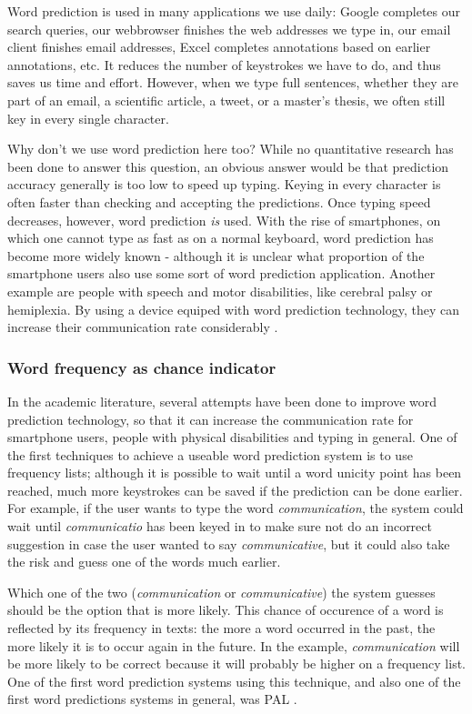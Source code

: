 \documentclass[12pt]{article}
\begin{document}
Word prediction is used in many applications we use daily: Google completes our search queries, our webbrowser finishes the web addresses we type in, our email client finishes email addresses, Excel completes annotations based on earlier annotations, etc. It reduces the number of keystrokes we have to do, and thus saves us time and effort. However, when we type full sentences, whether they are part of an email, a scientific article, a tweet, or a master's thesis, we often still key in every single character. 

Why don't we use word prediction here too? While no quantitative research has been done to answer this question, an obvious answer would be that prediction accuracy generally is too low to speed up typing. Keying in every character is often faster than checking and accepting the predictions. Once typing speed decreases, however, word prediction \emph{is} used. With the rise of smartphones,  on which one  cannot type as fast as on a normal keyboard, word prediction has become more widely known - although it is unclear what proportion of the smartphone users also use some sort of word prediction application. Another example are  people with speech and motor disabilities, like cerebral palsy or hemiplexia. By using a device equiped with word prediction technology, they can increase their communication rate considerably \cite{Garay-Vitoria+06}.

\subsubsection{Word frequency as chance indicator}

In the academic literature, several attempts have been done to improve word prediction technology, so that it can increase the communication rate for smartphone users, people with physical disabilities and typing in general. One of the first techniques to achieve a useable word prediction system is to use frequency lists; although it is possible to wait until a word unicity point has been reached, much more keystrokes can be saved if the prediction can be done earlier. For example, if the user wants to type the word \emph{communication}, the system could wait until \emph{communicatio} has been keyed in to make sure not do an incorrect suggestion in case the user wanted to say \emph{communicative}, but it could also take the risk and guess one of the words much earlier. 

Which one of the two (\emph{communication} or \emph{communicative}) the system guesses should be the option that is more likely. This chance of occurence of a word is reflected by its frequency in texts: the more a word occurred in the past, the more likely it is to occur again in the future. In the example, \emph{communication} will be more likely to be correct because it will probably be higher on a frequency list. One of the first word prediction systems using this technique, and also one of the first word predictions systems in general, was PAL \cite{swiffin+85}. 
\end{document}
